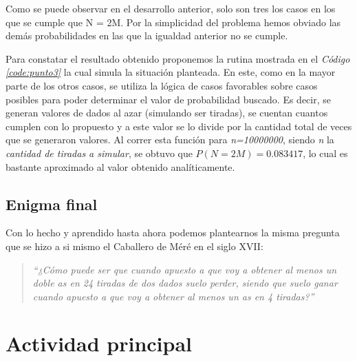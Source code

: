 \documentclass{article}
\newcommand{\refcode}[1]{\textit{Código \ref{#1}}}
\begin{document}
\noindent Como se puede observar en el desarrollo anterior, solo son tres los casos en los que se cumple que N = 2M. Por la simplicidad del problema hemos obviado las demás probabilidades en las que la igualdad anterior no se cumple.
	\par
	Para constatar el resultado obtenido proponemos la rutina mostrada en el \refcode{code:punto3} la cual simula la situación planteada. En este, como en la mayor parte de los otros casos, se utiliza la lógica de casos favorables sobre casos posibles para poder determinar el valor de probabilidad buscado. Es decir, se generan valores de dados al azar (simulando ser tiradas), se cuentan cuantos cumplen con lo propuesto y a este valor se lo divide por la cantidad total de veces que se generaron valores. Al correr esta función para \textit{n=10000000}, siendo \textit{n} la \textit{cantidad de tiradas a simular}, se obtuvo que $ {P}(N=2M) = 0.083417$, lo cual es bastante aproximado al valor obtenido analíticamente.



\subsection{Enigma final}

Con lo hecho y aprendido hasta ahora podemos plantearnos la misma pregunta que se hizo a si mismo el Caballero de Méré en el siglo XVII: 

\begin{quotation}
\em``¿Cómo puede ser que cuando apuesto a que voy a obtener al menos un doble as en 24 tiradas de dos dados suelo perder, siendo que suelo ganar cuando apuesto a que voy a obtener al menos un as en 4 tiradas?''
\end{quotation}






\section{Actividad principal}
\end{document}
